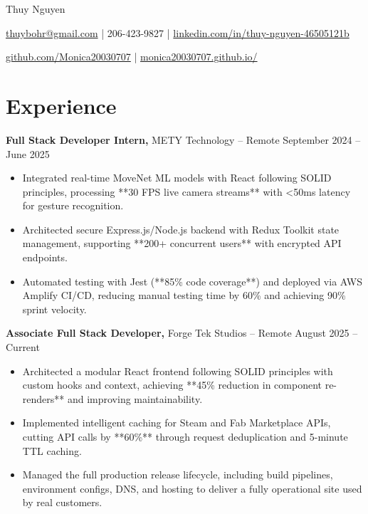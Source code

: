 \documentclass[11pt]{article}       %
\begin{document}
\centerline{\Huge Thuy Nguyen}

\vspace{5pt}

\centerline{\href{mailto:thuybohr@gmail.com}{thuybohr@gmail.com} | 206-423-9827 |
\href{https://www.linkedin.com/in/thuy-nguyen-46505121b/}{linkedin.com/in/thuy-nguyen-46505121b}}

\centerline{\href{https://github.com/Monica20030707}{github.com/Monica20030707} | 
\href{https://monica20030707.github.io/}{monica20030707.github.io/}} 

\vspace{-9pt}

\section*{Experience}

\textbf{Full Stack Developer Intern,} {METY Technology} -- Remote \hfill September 2024 -- June 2025 
\vspace{-9pt}
\begin{itemize}
  \item Integrated real-time MoveNet ML models with React following SOLID principles, processing **30 FPS live camera streams** with <50ms latency for gesture recognition.
  \item Architected secure Express.js/Node.js backend with Redux Toolkit state management, supporting **200+ concurrent users** with encrypted API endpoints.
  \item Automated testing with Jest (**85\% code coverage**) and deployed via AWS Amplify CI/CD, reducing manual testing time by 60\% and achieving 90\% sprint velocity.
\end{itemize}

\textbf{Associate Full Stack Developer,} {Forge Tek Studios} -- Remote \hfill August 2025 -- Current 
\vspace{-9pt}
\begin{itemize}
  \item Architected a modular React frontend following SOLID principles with custom hooks and context, achieving **45\% reduction in component re-renders** and improving maintainability.
  \item Implemented intelligent caching for Steam and Fab Marketplace APIs, cutting API calls by **60\%** through request deduplication and 5-minute TTL caching.
  \item Managed the full production release lifecycle, including build pipelines, environment configs, DNS, and hosting to deliver a fully operational site used by real customers.
\end{itemize}
\end{document}
